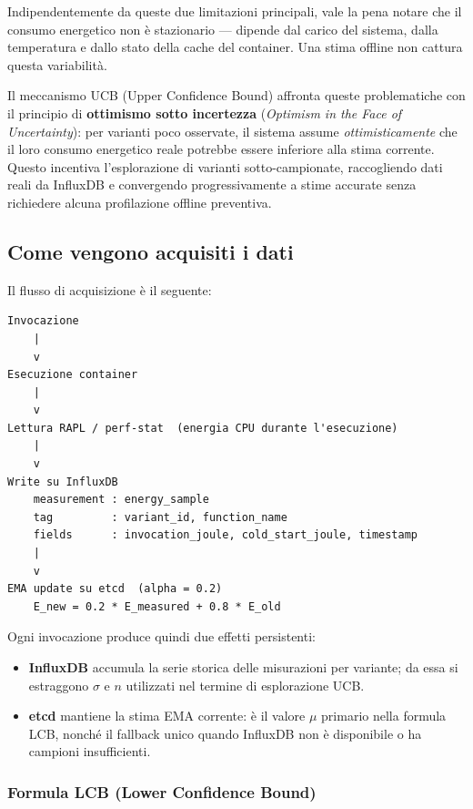 \documentclass[a4paper,11pt]{article}
\begin{document}
Indipendentemente da queste due limitazioni principali, vale la pena notare che il
consumo energetico non è stazionario --- dipende dal carico del sistema, dalla
temperatura e dallo stato della cache del container. Una stima offline non cattura
questa variabilità.

Il meccanismo UCB (Upper Confidence Bound) affronta queste problematiche con il
principio di \textbf{ottimismo sotto incertezza} (\textit{Optimism in the Face of
Uncertainty}): per varianti poco osservate, il sistema assume \textit{ottimisticamente}
che il loro consumo energetico reale potrebbe essere inferiore alla stima corrente.
Questo incentiva l'esplorazione di varianti sotto-campionate, raccogliendo dati reali
da InfluxDB e convergendo progressivamente a stime accurate senza richiedere alcuna
profilazione offline preventiva.

\subsection{Come vengono acquisiti i dati}

Il flusso di acquisizione è il seguente:

\begin{lstlisting}
Invocazione
    |
    v
Esecuzione container
    |
    v
Lettura RAPL / perf-stat  (energia CPU durante l'esecuzione)
    |
    v
Write su InfluxDB
    measurement : energy_sample
    tag         : variant_id, function_name
    fields      : invocation_joule, cold_start_joule, timestamp
    |
    v
EMA update su etcd  (alpha = 0.2)
    E_new = 0.2 * E_measured + 0.8 * E_old
\end{lstlisting}

Ogni invocazione produce quindi due effetti persistenti:

\begin{itemize}
  \item \textbf{InfluxDB} accumula la serie storica delle misurazioni per variante; da
    essa si estraggono $\sigma$ e $n$ utilizzati nel termine di esplorazione UCB.
  \item \textbf{etcd} mantiene la stima EMA corrente: è il valore $\mu$ primario nella
    formula LCB, nonché il fallback unico quando InfluxDB non è disponibile o ha
    campioni insufficienti.
\end{itemize}

\subsubsection*{Formula LCB (Lower Confidence Bound)}
\end{document}
